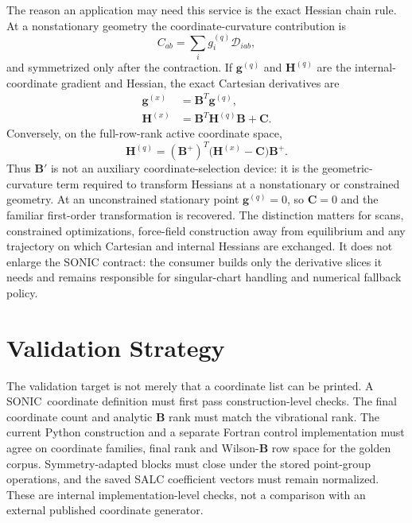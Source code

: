 \documentclass[journal=jctcce,manuscript=article,layout=traditional]{achemso}
\newcommand{\SONIC}{SONIC}
\newcommand{\Bmat}{\mathbf{B}}
\theoremstyle{definition}
\begin{document}
The reason an application may need this service is the exact Hessian chain
rule.  At a nonstationary geometry the coordinate-curvature contribution is
\begin{equation}
 C_{ab}=\sum_i g_i^{(q)}\mathcal D_{iab},
 \label{eq:sparse-b-curvature}
\end{equation}
and symmetrized only after the contraction.  If \(\mathbf g^{(q)}\) and
\(\mathbf H^{(q)}\) are the internal-coordinate gradient and Hessian, the exact
Cartesian derivatives are
\begin{align}
 \mathbf g^{(x)} &= \Bmat^T\mathbf g^{(q)},\\
 \mathbf H^{(x)} &= \Bmat^T\mathbf H^{(q)}\Bmat+\mathbf C.
 \label{eq:hessian-chain-rule}
\end{align}
Conversely, on the full-row-rank active coordinate space,
\begin{equation}
 \mathbf H^{(q)}=(\Bmat^+)^T\bigl(\mathbf H^{(x)}-\mathbf C\bigr)\Bmat^+.
 \label{eq:hessian-back-transformation}
\end{equation}
Thus \(\Bmat'\) is not an auxiliary coordinate-selection device: it is the
geometric-curvature term required to transform Hessians at a nonstationary or
constrained geometry.  At an unconstrained stationary point
\(\mathbf g^{(q)}=0\), so \(\mathbf C=0\) and the familiar first-order
transformation is recovered.  The distinction matters for scans, constrained
optimizations, force-field construction away from equilibrium and any
trajectory on which Cartesian and internal Hessians are exchanged.  It does
not enlarge the SONIC contract: the consumer builds only the derivative slices
it needs and remains responsible for singular-chart handling and numerical
fallback policy.

\section{Validation Strategy}

The validation target is not merely that a coordinate list can be printed.  A
\SONIC\ coordinate definition must first pass construction-level checks.  The
final coordinate count and analytic \(\Bmat\) rank must match the vibrational
rank.  The current Python construction and a separate Fortran control
implementation must agree on coordinate families, final rank and
Wilson-\(\Bmat\) row space for the golden corpus.  Symmetry-adapted blocks must
close under the stored point-group operations, and the saved SALC coefficient
vectors must remain normalized.  These are internal implementation-level
checks, not a comparison with an external published coordinate generator.
\end{document}
